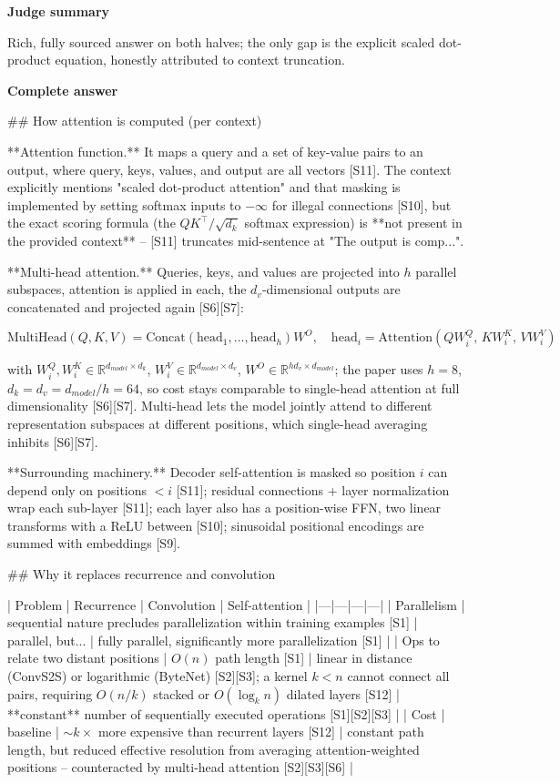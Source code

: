 \documentclass[10pt]{article}
\begin{document}
\textbf{Judge summary}
\begin{EvidenceText}
Rich, fully sourced answer on both halves; the only gap is the explicit scaled dot-product equation, honestly attributed to context truncation.
\end{EvidenceText}

\textbf{Complete answer}
\begin{AnswerText}
## How attention is computed (per context)

**Attention function.** It maps a query and a set of key-value pairs to an output, where query, keys, values, and output are all vectors [S11]. The context explicitly mentions "scaled dot-product attention" and that masking is implemented by setting softmax inputs to $-\infty$ for illegal connections [S10], but the exact scoring formula (the $QK^\top/\sqrt{d_k}$ softmax expression) is **not present in the provided context** -- [S11] truncates mid-sentence at "The output is comp...".

**Multi-head attention.** Queries, keys, and values are projected into $h$ parallel subspaces, attention is applied in each, the $d_v$-dimensional outputs are concatenated and projected again [S6][S7]:

$$\mathrm{MultiHead}(Q,K,V)=\mathrm{Concat}(\mathrm{head}_1,\dots,\mathrm{head}_h)W^O,\quad \mathrm{head}_i=\mathrm{Attention}(QW_i^Q,\,KW_i^K,\,VW_i^V)$$

with $W_i^Q,W_i^K\in\mathbb{R}^{d_{model}\times d_k}$, $W_i^V\in\mathbb{R}^{d_{model}\times d_v}$, $W^O\in\mathbb{R}^{hd_v\times d_{model}}$; the paper uses $h=8$, $d_k=d_v=d_{model}/h=64$, so cost stays comparable to single-head attention at full dimensionality [S6][S7]. Multi-head lets the model jointly attend to different representation subspaces at different positions, which single-head averaging inhibits [S6][S7].

**Surrounding machinery.** Decoder self-attention is masked so position $i$ can depend only on positions $<i$ [S11]; residual connections + layer normalization wrap each sub-layer [S11]; each layer also has a position-wise FFN, two linear transforms with a ReLU between [S10]; sinusoidal positional encodings are summed with embeddings [S9].

## Why it replaces recurrence and convolution

| Problem | Recurrence | Convolution | Self-attention |
|---|---|---|---|
| Parallelism | sequential nature precludes parallelization within training examples [S1] | parallel, but... | fully parallel, significantly more parallelization [S1] |
| Ops to relate two distant positions | $O(n)$ path length [S1] | linear in distance (ConvS2S) or logarithmic (ByteNet) [S2][S3]; a kernel $k<n$ cannot connect all pairs, requiring $O(n/k)$ stacked or $O(\log_k n)$ dilated layers [S12] | **constant** number of sequentially executed operations [S1][S2][S3] |
| Cost | baseline | $\sim k\times$ more expensive than recurrent layers [S12] | constant path length, but reduced effective resolution from averaging attention-weighted positions -- counteracted by multi-head attention [S2][S3][S6] |


\end{AnswerText}
\end{document}
